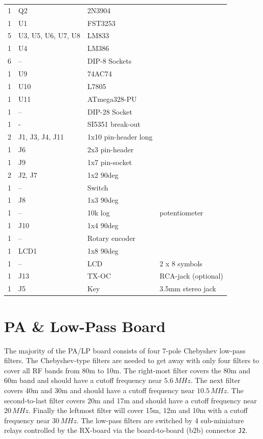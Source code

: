 \documentclass[10pt, a4paper,twoside]{scrartcl}
\begin{document}
\begin{longtable}{|l|p{6cm}|l|l|}
1 & Q2 & 2N3904 & \\
1 & U1 & FST3253 & \\
5 & U3, U5, U6, U7, U8 & LM833 & \\
1 & U4 & LM386 & \\ 
6 & -- & DIP-8 Sockets & \\
1 & U9 & 74AC74 & \\
1 & U10 & L7805 & \\
1 & U11 & ATmega328-PU & \\
1 & --  & DIP-28 Socket & \\
1 & - & SI5351 break-out & \\
2 & J1, J3, J4, J11 & 1x10 pin-header long & \\
1 & J6 & 2x3 pin-header & \\
1 & J9 & 1x7 pin-socket & \\
2 & J2, J7 & 1x2 90deg & \\
1 & -- & Switch & \\
1 & J8 & 1x3 90deg & \\
1 & -- & 10k log & potentiometer \\
1 & J10 & 1x4 90deg & \\
1 & -- & Rotary encoder & \\
1 & LCD1 & 1x8 90deg & \\
1 & -- & LCD & 2 x 8 symbols \\
1 & J13 & TX-OC & RCA-jack (optional) \\
1 & J5 & Key & 3.5mm stereo jack\\ \hline
\end{longtable}


\cleardoublepage
\section{PA \& Low-Pass Board} \label{sec:pa}
The majority of the PA/LP board consists of four 7-pole Chebyshev low-pass filters. The Chebyshev-type filters are needed to get away with only four filters to cover all RF bands from 80m to 10m. The right-most filter covers the 80m and 60m band and should have a cutoff frequency near $5.6\,MHz$. The next filter covers 40m and 30m and should have a cutoff frequency near $10.5\,MHz$. The second-to-last filter covers 20m and 17m and should have a cutoff frequency near $20\,MHz$. Finally the leftmost filter will cover 15m, 12m and 10m with a cutoff frequency near $30\,MHz$. The low-pass filters are switched by 4 sub-miniature relays controlled by the RX-board via the board-to-board (b2b) connector \texttt{J2}.
\end{document}
